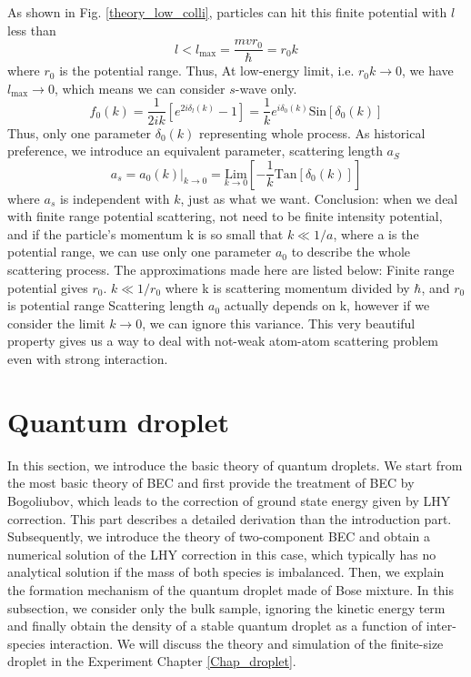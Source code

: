 As shown in Fig. \ref{theory_low_colli}, particles can hit this finite potential with $l$ less than 
\begin{equation}
l<l_{\max }=\frac{m v r_0}{\hbar }=r_0 k
\end{equation}
where $r_0$ is the potential range. Thus, At low-energy limit, i.e. $r_0k\to 0$, we have $l_{\max }\to 0$, which means we can consider $s$-wave only.
\begin{equation}
f_0(k)=\frac{1}{2ik}\left[e^{2i\delta_l(k)}-1\right]=\frac{1}{k}e^{i \delta _0(k)}\text{Sin}\left[\delta _0(k)\right]
\end{equation}
Thus, only one parameter $\delta _0(k)$ representing whole process. As historical preference, we introduce an equivalent parameter, scattering length $a_S$
\begin{equation}
a_s=a_0(k)|_{k\to0}=\underset{k\to0}{\text{Lim}}\left[-\frac{1}{k}\text{Tan}\left[\delta _0(k)\right]\right]
\end{equation}
where $a_s$ is independent with $k$, just as what we want.
Conclusion: when we deal with finite range potential scattering, not need to be finite intensity potential, and if the particle's momentum k is so small that $k \ll 1/a$, where a is the potential range, we can use only one parameter $a_0$ to describe the whole scattering process. The approximations made here are listed below:
Finite range potential gives $r_0$.
$k \ll 1/r_0$ where k is scattering momentum divided by $\hbar$, and $r_0$ is potential range
Scattering length $a_0$ actually depends on k, however if we consider the limit $k\to 0$, we can ignore this variance.
This very beautiful property gives us a way to deal with not-weak atom-atom scattering problem even with strong interaction.



\section{Quantum droplet}
\label{sec:droplet_ana}

In this section, we introduce the basic theory of quantum droplets. We start from the most basic theory of BEC and first provide the treatment of BEC by Bogoliubov, which leads to the correction of ground state energy given by LHY correction. This part describes a detailed derivation than the introduction part. Subsequently, we introduce the theory of two-component BEC and obtain a numerical solution of the LHY correction in this case, which typically has no analytical solution if the mass of both species is imbalanced. Then, we explain the formation mechanism of the quantum droplet made of Bose mixture. In this subsection, we consider only the bulk sample, ignoring the kinetic energy term and finally obtain the density of a stable quantum droplet as a function of inter-species interaction. We will discuss the theory and simulation of the finite-size droplet in the Experiment Chapter \ref{Chap_droplet}.

